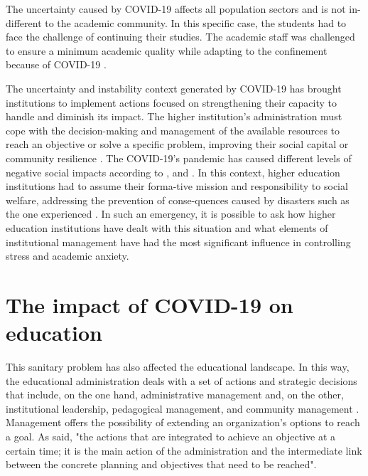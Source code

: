 \documentclass[english]{textolivre}
\begin{document}
The uncertainty caused by COVID-19 affects all population sectors and is not in-different to the academic community. In this specific case, the students had to face the challenge of continuing their studies. The academic staff was challenged to ensure a minimum academic quality while adapting to the confinement because of COVID-19 \cite{garcia_aretio_saberes_2020}.

The uncertainty and instability context generated by COVID-19 has brought institutions to implement actions focused on strengthening their capacity to handle and diminish its impact. The higher institution's administration must cope with the decision-making and management of the available resources to reach an objective or solve a specific problem, improving their social capital or community resilience \cite{aparicio_capital_2017}.  The COVID-19’s pandemic has caused different levels of negative social impacts according to \textcite{turcaz_romero_intervencion_2016}, and \textcite{valdez_zepeda_public_2018}. In this context, higher education institutions had to assume their forma-tive mission and responsibility to social welfare, addressing the prevention of conse-quences caused by disasters such as the one experienced \cite{astudillo_pizarro_spatial_2019,perez_perez_service-learning_2019}. In such an emergency, it is possible to ask how higher education institutions have dealt with this situation and what elements of institutional management have had the most significant influence in controlling stress and academic anxiety.

\section{The impact of COVID-19 on education}

This sanitary problem has also affected the educational landscape. In this way, the educational administration deals with a set of actions and strategic decisions that include, on the one hand, administrative management and, on the other, institutional leadership, pedagogical management, and community management \cite{meza_revatta_gestion_2020}. Management offers the possibility of extending an organization's options to reach a goal. As \textcite[p.~57]{torres_pacheco_gestion_2015} said, "the actions that are integrated to achieve an objective at a certain time; it is the main action of the administration and the intermediate link between the concrete planning and objectives that need to be reached".%
\end{document}
